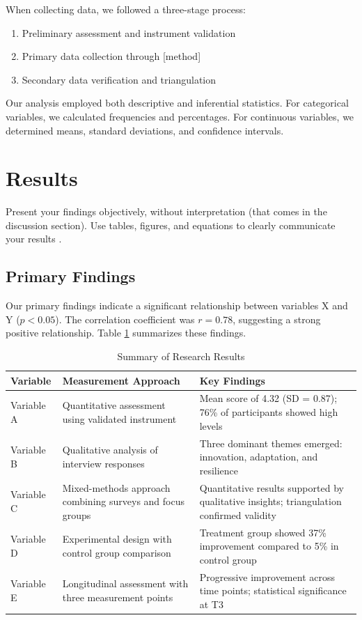 \documentclass[11pt]{article}
\begin{document}
When collecting data, we followed a three-stage process:
\begin{enumerate}
    \item Preliminary assessment and instrument validation
    \item Primary data collection through [method]
    \item Secondary data verification and triangulation
\end{enumerate}

Our analysis employed both descriptive and inferential statistics. For categorical variables, we calculated frequencies and percentages. For continuous variables, we determined means, standard deviations, and confidence intervals.

\section{Results}
\label{sec:results}

Present your findings objectively, without interpretation (that comes in the discussion section). Use tables, figures, and equations to clearly communicate your results \cite{smith2020example}.

\subsection{Primary Findings}

Our primary findings indicate a significant relationship between variables X and Y ($p < 0.05$). The correlation coefficient was $r = 0.78$, suggesting a strong positive relationship. Table \ref{tab:results} summarizes these findings.

\begin{table}[h!]
\centering
\caption{Summary of Research Results}
\label{tab:results}
\begin{tabular}{|p{3cm}|p{6cm}|p{6cm}|}
\hline
\textbf{Variable} & \textbf{Measurement Approach} & \textbf{Key Findings} \\
\hline
Variable A & Quantitative assessment using validated instrument & Mean score of 4.32 (SD = 0.87); 76\% of participants showed high levels \\
\hline
Variable B & Qualitative analysis of interview responses & Three dominant themes emerged: innovation, adaptation, and resilience \\
\hline
Variable C & Mixed-methods approach combining surveys and focus groups & Quantitative results supported by qualitative insights; triangulation confirmed validity \\
\hline
Variable D & Experimental design with control group comparison & Treatment group showed 37\% improvement compared to 5\% in control group \\
\hline
Variable E & Longitudinal assessment with three measurement points & Progressive improvement across time points; statistical significance at T3 \\
\hline
\end{tabular}
\end{table}
\end{document}
